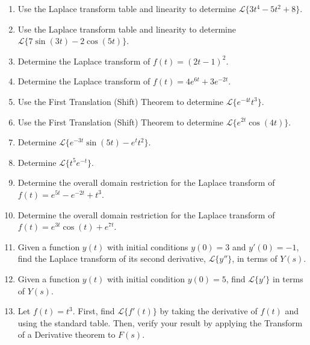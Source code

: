 \documentclass[11pt, letterpaper]{article}
\theoremstyle{definition}
\theoremstyle{remark}
\begin{document}
\begin{enumerate}[label=\textbf{Problem \arabic*.}, leftmargin=*]
    \item Use the Laplace transform table and linearity to determine $\mathscr{L}\{3t^4 - 5t^2 + 8\}$.
    
    \item Use the Laplace transform table and linearity to determine $\mathscr{L}\{7\sin(3t) - 2\cos(5t)\}$.
    
    \item Determine the Laplace transform of $f(t) = (2t-1)^2$.
    
    \item Determine the Laplace transform of $f(t) = 4e^{6t} + 3e^{-2t}$.
    
    \item Use the First Translation (Shift) Theorem to determine $\mathscr{L}\{e^{-4t}t^3\}$.
    
    \item Use the First Translation (Shift) Theorem to determine $\mathscr{L}\{e^{2t}\cos(4t)\}$.
    
    \item Determine $\mathscr{L}\{e^{-3t}\sin(5t) - e^{t}t^2\}$.
    
    \item Determine $\mathscr{L}\{t^5 e^{-t}\}$.
    
    \item Determine the overall domain restriction for the Laplace transform of $f(t) = e^{5t} - e^{-2t} + t^3$.
    
    \item Determine the overall domain restriction for the Laplace transform of $f(t) = e^{3t}\cos(t) + e^{7t}$.
    
    \item Given a function $y(t)$ with initial conditions $y(0) = 3$ and $y'(0) = -1$, find the Laplace transform of its second derivative, $\mathscr{L}\{y''\}$, in terms of $Y(s)$.
    
    \item Given a function $y(t)$ with initial condition $y(0) = 5$, find $\mathscr{L}\{y'\}$ in terms of $Y(s)$.
    
    \item Let $f(t) = t^3$. First, find $\mathscr{L}\{f'(t)\}$ by taking the derivative of $f(t)$ and using the standard table. Then, verify your result by applying the Transform of a Derivative theorem to $F(s)$.
    

\end{enumerate}
\end{document}
